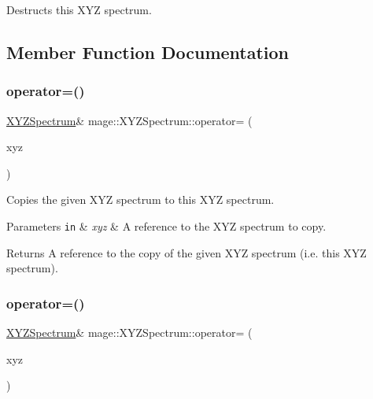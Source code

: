 Destructs this X\+YZ spectrum. 

\subsection{Member Function Documentation}
\hypertarget{structmage_1_1_x_y_z_spectrum_afb9ded2a6c69514b9853f753c5f94f98}{}\label{structmage_1_1_x_y_z_spectrum_afb9ded2a6c69514b9853f753c5f94f98} 
\subsubsection{\texorpdfstring{operator=()}{operator=()}\hspace{0.1cm}{\footnotesize\ttfamily [1/2]}}
{\footnotesize\ttfamily \hyperlink{structmage_1_1_x_y_z_spectrum}{X\+Y\+Z\+Spectrum}\& mage\+::\+X\+Y\+Z\+Spectrum\+::operator= (\begin{DoxyParamCaption}\item[{const \hyperlink{structmage_1_1_x_y_z_spectrum}{X\+Y\+Z\+Spectrum} \&}]{xyz }\end{DoxyParamCaption})\hspace{0.3cm}{\ttfamily [default]}}

Copies the given X\+YZ spectrum to this X\+YZ spectrum.


\begin{DoxyParams}[1]{Parameters}
\mbox{\tt in}  & {\em xyz} & A reference to the X\+YZ spectrum to copy. \\
\hline
\end{DoxyParams}
\begin{DoxyReturn}{Returns}
A reference to the copy of the given X\+YZ spectrum (i.\+e. this X\+YZ spectrum). 
\end{DoxyReturn}
\hypertarget{structmage_1_1_x_y_z_spectrum_a5191cffff5e1560164a34d43aa72441b}{}\label{structmage_1_1_x_y_z_spectrum_a5191cffff5e1560164a34d43aa72441b} 
\subsubsection{\texorpdfstring{operator=()}{operator=()}\hspace{0.1cm}{\footnotesize\ttfamily [2/2]}}
{\footnotesize\ttfamily \hyperlink{structmage_1_1_x_y_z_spectrum}{X\+Y\+Z\+Spectrum}\& mage\+::\+X\+Y\+Z\+Spectrum\+::operator= (\begin{DoxyParamCaption}\item[{\hyperlink{structmage_1_1_x_y_z_spectrum}{X\+Y\+Z\+Spectrum} \&\&}]{xyz }\end{DoxyParamCaption})\hspace{0.3cm}{\ttfamily [default]}}

